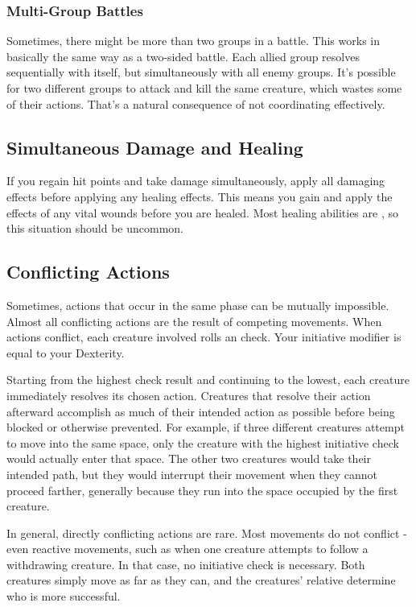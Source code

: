     \subsubsection{Multi-Group Battles}\label{Multi-Group Battles}
      Sometimes, there might be more than two groups in a battle.
      This works in basically the same way as a two-sided battle.
      Each allied group resolves sequentially with itself, but simultaneously with all enemy groups.
      It's possible for two different groups to attack and kill the same creature, which wastes some of their actions.
      That's a natural consequence of not coordinating effectively.

  \subsection{Simultaneous Damage and Healing}\label{Simultaneous Damage and Healing}
    If you regain hit points and take damage simultaneously, apply all damaging effects before applying any healing effects.
    This means you gain and apply the effects of any vital wounds before you are healed.
    Most healing abilities are , so this situation should be uncommon.

  \subsection{Conflicting Actions}\label{Conflicting Actions}
    Sometimes, actions that occur in the same phase can be mutually impossible.
    Almost all conflicting actions are the result of competing movements.
    When actions conflict, each creature involved rolls an  check.
    Your initiative modifier is equal to your Dexterity.

    Starting from the highest check result and continuing to the lowest, each creature immediately resolves its chosen action.
    Creatures that resolve their action afterward accomplish as much of their intended action as possible before being blocked or otherwise prevented.
    For example, if three different creatures attempt to move into the same space, only the creature with the highest initiative check would actually enter that space.
    The other two creatures would take their intended path, but they would interrupt their movement when they cannot proceed farther, generally because they run into the space occupied by the first creature.

    In general, directly conflicting actions are rare.
    Most movements do not conflict - even reactive movements, such as when one creature attempts to follow a withdrawing creature.
    In that case, no initiative check is necessary.
    Both creatures simply move as far as they can, and the creatures' relative  determine who is more successful.

